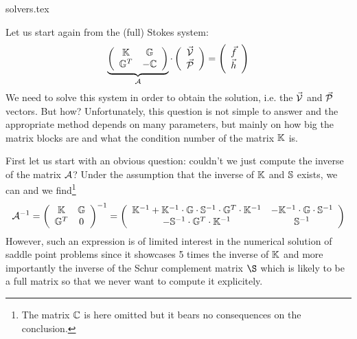 \begin{flushright} {\tiny {\color{gray} solvers.tex}} \end{flushright}

Let us start again from the (full) Stokes system:
\begin{equation}
\underbrace{
\left(
\begin{array}{cc}
{\mathbb{K}} & {\mathbb{G}} \\ {\mathbb{G}}^T & -{\mathbb{C}} 
\end{array}
\right)
}_{\cal A}
\cdot
\left(
\begin{array}{c}
\vec{\cal V} \\ \vec{\cal P}
\end{array}
\right)
=
\left(
\begin{array}{c}
\vec{f} \\ \vec{h}
\end{array}
\right)
\label{StokesSyst}
\end{equation}
We need to solve this system in order to obtain the solution, i.e. the $\vec{\cal V}$ 
and $\vec{\cal P}$ vectors. But how? 
Unfortunately, this question is not simple to answer and the appropriate method depends on many 
parameters, but mainly on how big the matrix blocks are and what the condition number of the matrix ${\mathbb{K}}$ is. 

First let us start with an obvious question: couldn't we just compute the inverse of the matrix ${\cal A}$?
Under the assumption that the inverse of ${\mathbb{K}}$ and ${\mathbb{S}}$ exists, we can and we find\footnote{The matrix 
${\mathbb{C}}$ is here omitted but it bears no consequences on the conclusion.}
\[
{\cal A}^{-1} = 
\left(
\begin{array}{cc}
{\mathbb{K}} & {\mathbb{G}} \\ {\mathbb{G}}^T & 0
\end{array}
\right)^{-1}
=
\left(
\begin{array}{cc}
{\mathbb{K}}^{-1} + {\mathbb{K}}^{-1} \cdot {\mathbb{G}} \cdot{\mathbb{S}}^{-1} \cdot{\mathbb{G}}^T \cdot{\mathbb{K}}^{-1} & -{\mathbb{K}}^{-1} \cdot{\mathbb{G}} \cdot{\mathbb{S}}^{-1} \\ 
-{\mathbb{S}}^{-1} \cdot{\mathbb{G}}^T \cdot{\mathbb{K}}^{-1}  &  {\mathbb{S}}^{-1}
\end{array}
\right)
\]
However, such an expression is of limited interest in the numerical solution of saddle
point problems since it showcases 5 times the inverse of ${\mathbb{K}}$ and more importantly
the inverse of the Schur complement matrix $\S$ which is likely to be a full matrix so 
that we never want to compute it explicitely.


